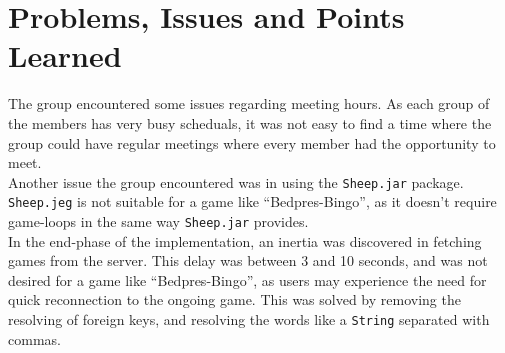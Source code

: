 \section{Problems, Issues and Points Learned}
\label{sec:issues}
The group encountered some issues regarding meeting hours. As each group
of the members has very busy scheduals, it was not easy to find a time where the group could have regular meetings where every member
had the opportunity to meet.\\

Another issue the group encountered
was in using the \texttt{Sheep.jar} package. \texttt{Sheep.jeg} is not
suitable for a game like ``Bedpres-Bingo'', as it doesn't require game-loops in the same way \texttt{Sheep.jar} provides.\\

In the end-phase of the implementation, an inertia was discovered in
fetching games from the server. This delay was between 3 and 10 seconds,
and was not desired for a game like ``Bedpres-Bingo'', as users may
experience the need for quick reconnection to the ongoing game. This was solved by removing the resolving of foreign keys, and resolving the words like a \texttt{String} separated with commas.